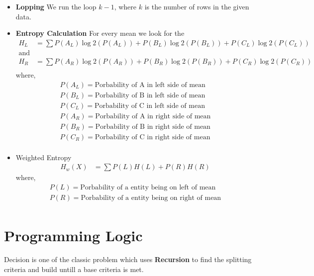 \documentclass[12pt,letterpaper]{article}
\begin{document}
\begin{itemize}
    \item \textbf{Lopping} \newline
    We run the loop $k-1$, where $k$ is the number of rows in the given data.
    \item \textbf{Entropy Calculation} \newline
    For every mean we look for the 
    \begin{align*}
         H_L &= \sum P(A_L) \log2(P(A_L)) + P(B_L) \log2(P(B_L)) + P(C_L) \log2(P(C_L)) \\
         \text{and} \\
         H_R &= \sum P(A_R) \log2(P(A_R)) + P(B_R) \log2(P(B_R)) + P(C_R) \log2(P(C_R)) \\
    \end{align*}
    where,
    \begin{align*}
        P(A_L) = \text{Porbability of A in left side of mean} \\
        P(B_L) = \text{Porbability of B in left side of mean}\\
        P(C_L) = \text{Porbability of C in left side of mean}\\
        P(A_R) = \text{Porbability of A in right side of mean} \\
        P(B_R) = \text{Porbability of B in right side of mean}\\
        P(C_R) = \text{Porbability of C in right side of mean}\\
    \end{align*}
    \item Weighted Entropy \newline
    \begin{align*}
        H_w(X) &= \sum P(L) H(L) + P(R)H(R) 
    \end{align*}
    where,
    \begin{align*}
        P(L) = \text{Porbability of a entity being on left of mean} \\
        P(R) = \text{Porbability of a entity being on right of mean}\\
    \end{align*}
\end{itemize}

\section{Programming Logic}
Decision is one of the classic problem which uses \textbf{Recursion} to find the splitting criteria and build untill a base criteria is met.
\end{document}
